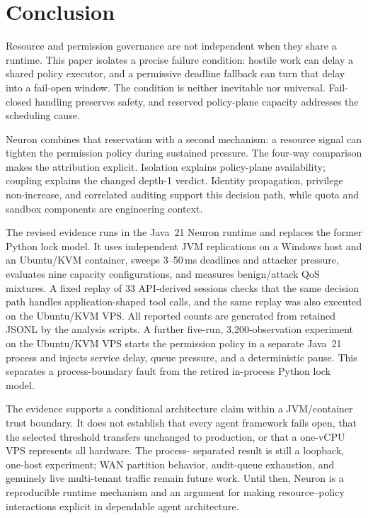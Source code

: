 \section{Conclusion}
\label{sec:conc}

Resource and permission governance are not independent when they share a
runtime. This paper isolates a precise failure condition: hostile work can
delay a shared policy executor, and a permissive deadline fallback can turn
that delay into a fail-open window. The condition is neither inevitable nor
universal. Fail-closed handling preserves safety, and reserved policy-plane
capacity addresses the scheduling cause.

Neuron combines that reservation with a second mechanism: a resource signal
can tighten the permission policy during sustained pressure. The four-way
comparison makes the attribution explicit. Isolation explains policy-plane
availability; coupling explains the changed depth-1 verdict. Identity
propagation, privilege non-increase, and correlated auditing support this
decision path, while quota and sandbox components are engineering context.

The revised evidence runs in the Java~21 Neuron runtime and replaces the
former Python lock model. It uses independent JVM replications on a Windows
host and an Ubuntu/KVM container, sweeps 3--50\,ms deadlines and attacker
pressure, evaluates nine capacity configurations, and measures benign/attack
QoS mixtures. A fixed replay of 33 API-derived sessions checks that the same
decision path handles application-shaped tool calls, and the same replay was
also executed on the Ubuntu/KVM VPS. All reported counts are generated from
retained JSONL by the analysis scripts. A further five-run,
3,200-observation experiment on the Ubuntu/KVM VPS starts the permission
policy in a separate Java~21 process and injects service delay, queue pressure,
and a deterministic pause. This separates a process-boundary fault from the
retired in-process Python lock model.

The evidence supports a conditional architecture claim within a
JVM/container trust boundary. It does not establish that every agent
framework fails open, that the selected threshold transfers unchanged to
production, or that a one-vCPU VPS represents all hardware. The process-
separated result is still a loopback, one-host experiment; WAN partition
behavior, audit-queue exhaustion, and genuinely live multi-tenant traffic
remain future work.
Until then, Neuron is a reproducible runtime mechanism and an argument for
making resource--policy interactions explicit in dependable agent
architecture.

